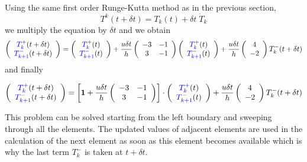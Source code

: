 \noindent
Using the same first order Runge-Kutta method as in the previous section, 
\begin{equation}
T^k(t+\delta t)=T_k(t) +\delta t \; \dot{T}_k
\end{equation}
we multiply the equation by $\delta t$ and we obtain 
\begin{eqnarray}
\left(
\begin{array}{cc}
{\color{blue} T_k^+}(t+\delta t)  \\
{\color{blue}T_{k+1}^-} (t+\delta t) 
\end{array}
\right)=
 \left(
\begin{array}{cc}
{\color{blue} T_k^+} (t) \\
{\color{blue}T_{k+1}^-} (t) 
\end{array}
\right)+
\frac{u \delta t}{h} 
\left(\begin{array}{cc}
    -3 & -1 \\
     3 & -1
\end{array}
\right)
\left(
\begin{array}{cc}
{\color{blue}T_k^+} (t) \\
{\color{blue}T_{k+1}^-} (t)
\end{array}
\right) + 
\frac{u \delta t}{h} \left(
\begin{array}{cc}
     4   \\
     -2 
\end{array}
\right)T_k^- (t+\delta t) 
\end{eqnarray}
and finally
\begin{mdframed}[backgroundcolor=blue!5]
\begin{eqnarray}
\left(
\begin{array}{cc}
{\color{blue} T_k^+}(t+\delta t)  \\
{\color{blue}T_{k+1}^-} (t+\delta t) 
\end{array}
\right)=
\left[
{\bm 1} + 
\frac{u \delta t}{h} 
\left(\begin{array}{cc}
    -3 & -1 \\
     3 & -1
\end{array}
\right)
\right]\cdot
\left(
\begin{array}{cc}
{\color{blue}T_k^+} (t) \\
{\color{blue}T_{k+1}^-} (t)
\end{array}
\right) + 
\frac{u \delta t}{h} \left(
\begin{array}{cc}
     4   \\
     -2 
\end{array}
\right)T_k^- (t+\delta t) 
\end{eqnarray}
\end{mdframed}







This problem can be solved starting from the left boundary and sweeping through all the elements. The updated values of adjacent elements are used in the calculation of the next element as soon as this element becomes available which is why 
the last term $T_k^-$ is taken  at $t+\delta t$.
